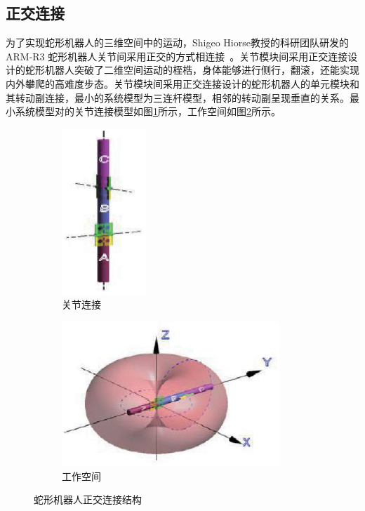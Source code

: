 \subsection{正交连接}
为了实现蛇形机器人的三维空间中的运动，Shigeo Hiorse教授的科研团队研发的ARM-R3 蛇形机器人关节间采用正交的方式相连接~\cite{Prautsch1999Control}。关节模块间采用正交连接设计的蛇形机器人突破了二维空间运动的桎梏，身体能够进行侧行，翻滚，还能实现内外攀爬的高难度步态。关节模块间采用正交连接设计的蛇形机器人的单元模块和其转动副连接，最小的系统模型为三连杆模型，相邻的转动副呈现垂直的关系。最小系统模型对的关节连接模型如图\ref{fig:orconnect}所示，工作空间如图\ref{fig:orspace}所示。
\begin{figure}[h!] %
	\begin{subfigure}{0.5\textwidth}
		\centering
		\includegraphics[width=0.35\textwidth,height=0.15\textheight]{figure/chap03/struct.eps}
		\caption{关节连接}
		\label{fig:orconnect}
	\end{subfigure}
	\begin{subfigure}{0.5\textwidth}
		\centering
		\includegraphics[width=0.9\textwidth,height=0.15\textheight]{figure/chap03/space.eps}
		\caption{工作空间}
		\label{fig:orspace}
	\end{subfigure}
	\caption{蛇形机器人正交连接结构}
	\label{fig:Orthogonal}
\end{figure}
